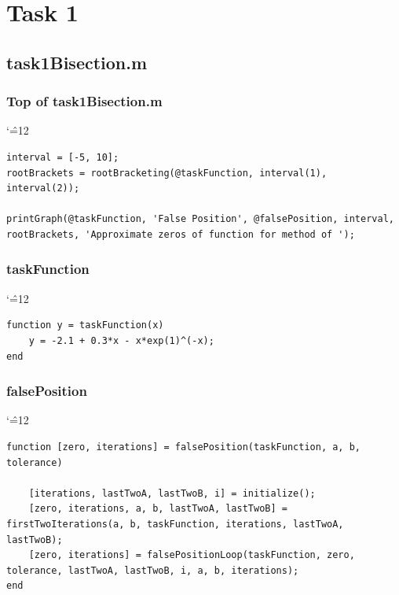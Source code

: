 \documentclass[12pt]{report}
\newenvironment{simplechar}{%
   \catcode`\^=12
}{}
\begin{document}
\section{Task 1}

\subsection{task1Bisection.m}

\subsubsection{Top of task1Bisection.m}
\begin{simplechar}
\begin{lstlisting}
interval = [-5, 10];
rootBrackets = rootBracketing(@taskFunction, interval(1), interval(2));

printGraph(@taskFunction, 'False Position', @falsePosition, interval, rootBrackets, 'Approximate zeros of function for method of ');
\end{lstlisting}
\end{simplechar}

\subsubsection{taskFunction}
\begin{simplechar}
\begin{lstlisting}
function y = taskFunction(x)
    y = -2.1 + 0.3*x - x*exp(1)^(-x);
end
\end{lstlisting}
\end{simplechar}

\newpage
\subsubsection{falsePosition}
\begin{simplechar}
\begin{lstlisting}
function [zero, iterations] = falsePosition(taskFunction, a, b, tolerance)

    [iterations, lastTwoA, lastTwoB, i] = initialize();
    [zero, iterations, a, b, lastTwoA, lastTwoB] = firstTwoIterations(a, b, taskFunction, iterations, lastTwoA, lastTwoB);
    [zero, iterations] = falsePositionLoop(taskFunction, zero, tolerance, lastTwoA, lastTwoB, i, a, b, iterations);
end
\end{lstlisting}
\end{simplechar}
\end{document}
